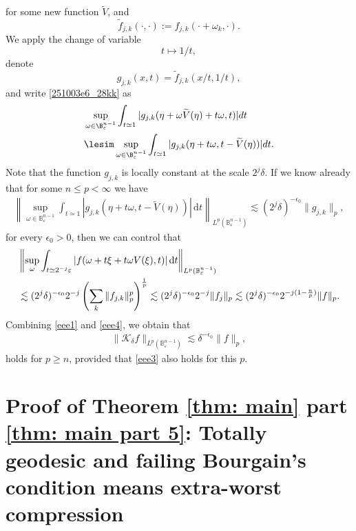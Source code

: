 \documentclass{article}
\numberwithin{equation}{section}
\theoremstyle{plain}
\begin{document}
 for some new function $\widetilde{V}$, and 
 \begin{equation}
 \widetilde{f}_{j, k}(\cdot, \cdot):= f_{j, k}(\cdot+ \omega_k, \cdot).
 \end{equation}
We apply the change of variable 
\begin{equation}
t\mapsto 1/t,
\end{equation}
denote 
\begin{equation}
g_{j, k}(x, t)=\widetilde{f}_{j, k}(x/t, 1/t),
\end{equation}
and write \eqref{251003e6_28kk} as 
\begin{align}
& 
\sup_{\omega\in \B^{n-1}_{\varepsilon}}\int_{t\simeq 1} |
g_{j, k}(\eta+ \omega\widetilde{V}(\eta)+ t\omega, t)
|d t\\
& \lesim \sup_{\omega\in \B^{n-1}_{\varepsilon}}\int_{t\simeq 1} |
g_{j, k}(\eta+ t\omega, t-\widetilde{V}(\eta))
|d t.
\end{align}
Note that the function $g_{j,k}$ is locally constant at the scale $2^j\delta$. If we know already that for some $n\le p<\infty$ we have
	\begin{align}\label{eee3}
		\left\| \sup_{\omega\in \mathbb{B}^{n-1}_\varepsilon} \int_{t\simeq 1} |g_{j,k}(\eta+ t\omega, t -\widetilde{V}(\eta))| \,\text{d}t\right\|_{L^p(\mathbb{B}^{n-1}_\varepsilon)}\lesssim (2^j\delta)^{-\epsilon_0}\|g_{j,k}\|_p,
	\end{align}
for every $\epsilon_0>0$, 
	then we can control that
	\begin{align}\label{eee4}
		& \left\| \sup_\omega \int_{t\simeq 2^{-j}\varepsilon} |f(\omega+ t\xi+ t\omega V(\xi),t)| \,\text{d}t\right\|_{L^p(\mathbb{B}^{n-1}_\varepsilon)} \\
		&\lesssim (2^j\delta)^{-\epsilon_0}2^{-j}\left( \sum_k  \|f_{j,k}\|_p^p  \right)^{\frac1p} \notag\lesssim (2^j\delta)^{-\epsilon_0}2^{-j}\|f_j\|_p \notag\lesssim (2^j\delta)^{-\epsilon_0}2^{-j(1-\frac{n}{p})}\|f\|_p.
	\end{align}
	Combining \eqref{eee1} and \eqref{eee4}, we obtain that
	\begin{align}
		\|\mathcal{K}_\delta f\|_{L^p(\mathbb{B}^{n-1}_\varepsilon)}\lesssim \delta^{-\epsilon_0}\|f\|_p,
	\end{align}
	holds for $p\ge n$, provided that \eqref{eee3} also holds for this $p$.





\section{Proof of Theorem \ref{thm: main} part \ref{thm: main part 5}: Totally geodesic and failing Bourgain's condition means extra-worst compression}\label{251003sec7}
\end{document}
